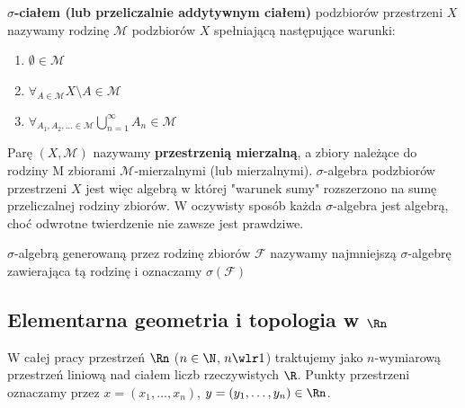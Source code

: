 \begin{defi}
    \textbf{$\sigma$-ciałem (lub przeliczalnie addytywnym ciałem)} podzbiorów przestrzeni $X$ nazywamy rodzinę $\mathcal{M}$ podzbiorów $X$ spełniającą następujące warunki:
    \begin{enumerate}
        \item $\emptyset \in \mathcal{M}$
        \item $\forall_{A \in \mathcal{M}} X \setminus A \in \mathcal{M}$
        \item $\forall_{A_1, A_2, \ldots \in \mathcal{M}} \bigcup_{n = 1}^\infty A_n \in \mathcal{M}$
    \end{enumerate}
    Parę $(X, \mathcal{M})$ nazywamy \textbf{przestrzenią mierzalną}, a zbiory należące do rodziny M zbiorami $\mathcal{M}$-mierzalnymi (lub mierzalnymi).
    $\sigma$-algebra podzbiorów przestrzeni $X$ jest więc algebrą w której "warunek sumy" rozszerzono na sumę przeliczalnej rodziny zbiorów. W oczywisty sposób każda $\sigma$-algebra jest algebrą, choć odwrotne twierdzenie nie zawsze jest prawdziwe.
\end{defi}

\begin{defi}
    $\sigma$-algebrą generowaną przez rodzinę zbiorów $\mathcal{F}$ nazywamy najmniejszą $\sigma$-algebrę zawierająca tą rodzinę i oznaczamy $\sigma(\mathcal{F})$
\end{defi}

\subsection{Elementarna geometria i topologia w $\Rn$}

W całej pracy przestrzeń $\Rn$ ($n \in \N$, $n \wlr 1$) traktujemy jako $n$-wymiarową przestrzeń liniową nad ciałem liczb rzeczywistych $\R$. Punkty przestrzeni oznaczamy przez $x = (x_1, \ldots, x_n)$, $y = (y_1, \ldots, y_n) \in \Rn$.

